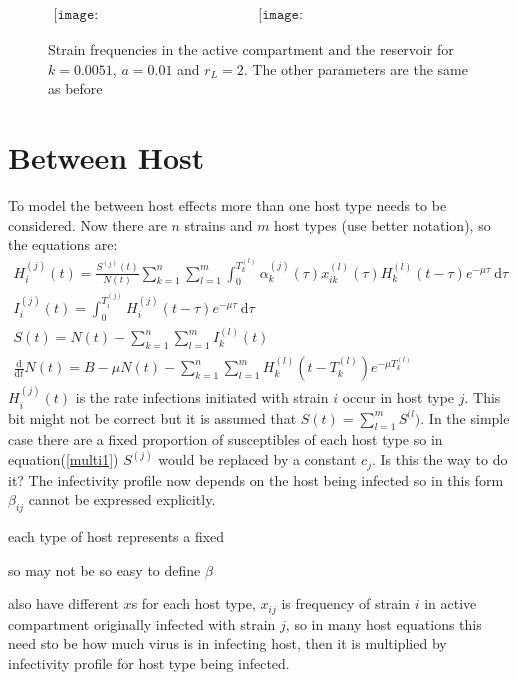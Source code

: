 \documentclass[DIV=15]{scrartcl}
\begin{document}
\begin{figure}[h]
 \begin{center}$
 \begin{array}{cc}
 \texttt{[image: WithinHostActive\_20\_04a.eps]} &
 \texttt{[image: WithinHostReservoir\_20\_04a.eps]}
 \end{array}$
 \end{center}
 \caption{Strain frequencies in the active compartment and the reservoir for $k = 0.0051$, $a = 0.01$ and $r_L = 2$. The other parameters are the same as before}
 \label{freqwithres}
 \end{figure}
 
\section*{Between  Host}
To model  the between host effects more than one host type needs to  be considered. Now there are $n$ strains and $m$ host types (use better notation), so the equations are: 
\begin{gather}
H^{(j)}_{i}(t) = \frac{S^{(j)}(t)}{N(t)}  \sum_{k=1}^n \sum_{l=1}^m  \int_0^{T^{(l)}_{k}} \alpha^{(j)}_{k}(\tau) x^{(l)}_{ik}(\tau) H^{(l)}_{k}(t-\tau)e^{-\mu \tau} \ \text{d}\tau \label{multi1} \\
I_i^{(j)}(t) = \int_0^{T_i^{(j)}}  H_i^{(j)}(t-\tau)e^{-\mu \tau} \  \text{d}\tau \\
S(t) = N(t) -  \sum_{k=1}^n \sum_{l=1}^m  I^{(l)}_k(t) \\
\frac{\text{d}}{\text{d} t}  N(t) = B- \mu N(t) -\sum_{k=1}^n \sum_{l=1}^m  H_k^{(l)}(t-T_k^{(l)})e^{-\mu T_k^{(l)}}
\end{gather}
$H^{(j)}_{i}(t)$ is the rate infections initiated with strain $i$ occur in host type $j$. This bit might not be correct but it is assumed that $S(t) =  \sum_{l=1}^m S^{(l})$. In the simple case there are a fixed proportion of susceptibles of each host type so in equation(\ref{multi1}) $S^{(j)}$ would be replaced by  a constant $c_j$. Is this the way to do it? The infectivity profile now depends on the host being infected so in this form $\beta_{ij}$ cannot be expressed explicitly.


each type of host represents a fixed 



so may not be so easy to define $\beta$

also have different $x$s for each host type, $x_{ij}$ is frequency of strain $i$ in active compartment originally infected with strain $j$, so in many host equations this need sto be how much virus is in infecting host, then it is multiplied by infectivity profile for host type being infected.
\end{document}
